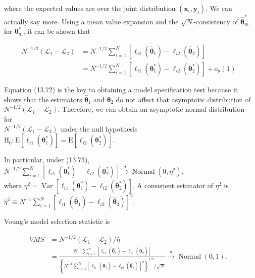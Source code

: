 \documentclass[10pt]{article}
\begin{document}
where the expected values are over the joint distribution $\left(\mathbf{x}_{i}, \mathbf{y}_{i}\right)$. We can actually say more. Using a mean value expansion and the $\sqrt{N}$-consistency of $\hat{\boldsymbol{\theta}}_{m}^{*}$ for $\boldsymbol{\theta}_{m}^{*}$, it can be shown that


\begin{align*}
N^{-1 / 2}\left(\mathscr{L}_{1}-\mathscr{L}_{2}\right) & =N^{-1 / 2} \sum_{i=1}^{N}\left[\ell_{i 1}\left(\hat{\boldsymbol{\theta}}_{1}\right)-\ell_{i 2}\left(\hat{\boldsymbol{\theta}}_{2}\right)\right] \\
& =N^{-1 / 2} \sum_{i=1}^{N}\left[\ell_{i 1}\left(\boldsymbol{\theta}_{1}^{*}\right)-\ell_{i 2}\left(\boldsymbol{\theta}_{2}^{*}\right)\right]+o_{p}(1) \tag{13.72}
\end{align*}


Equation (13.72) is the key to obtaining a model specification test because it shows that the estimators $\hat{\boldsymbol{\theta}}_{1}$ and $\hat{\boldsymbol{\theta}}_{2}$ do not affect that asymptotic distribution of $N^{-1 / 2}\left(\mathscr{L}_{1}-\mathscr{L}_{2}\right)$. Therefore, we can obtain an asymptotic normal distribution for\\
$N^{-1 / 2}\left(\mathscr{L}_{1}-\mathscr{L}_{2}\right)$ under the null hypothesis\\
$\mathrm{H}_{0}: \mathrm{E}\left[\ell_{i 1}\left(\boldsymbol{\theta}_{1}^{*}\right)\right]=\mathrm{E}\left[\ell_{i 2}\left(\boldsymbol{\theta}_{2}^{*}\right)\right]$.

In particular, under (13.73),\\
$N^{-1 / 2} \sum_{i=1}^{N}\left[\ell_{i 1}\left(\boldsymbol{\theta}_{1}^{*}\right)-\ell_{i 2}\left(\boldsymbol{\theta}_{2}^{*}\right)\right] \xrightarrow{d} \operatorname{Normal}\left(0, \eta^{2}\right)$,\\
where $\eta^{2}=\operatorname{Var}\left[\ell_{i 1}\left(\boldsymbol{\theta}_{1}^{*}\right)-\ell_{i 2}\left(\boldsymbol{\theta}_{2}^{*}\right)\right]$. A consistent estimator of $\eta^{2}$ is\\
$\hat{\eta}^{2} \equiv N^{-1} \sum_{i=1}^{N}\left[\ell_{i 1}\left(\hat{\boldsymbol{\theta}}_{1}\right)-\ell_{i 2}\left(\hat{\boldsymbol{\theta}}_{2}\right)\right]^{2}$.

Voung's model selection statistic is


\begin{align*}
V M S & =N^{-1 / 2}\left(\mathscr{L}_{1}-\mathscr{L}_{2}\right) / \hat{\eta} \\
& =\frac{N^{-1} \sum_{i=1}^{N}\left[\ell_{i 1}\left(\hat{\boldsymbol{\theta}}_{1}\right)-\ell_{i 2}\left(\hat{\boldsymbol{\theta}}_{2}\right)\right]}{\left\{N^{-1} \sum_{i=1}^{N}\left[\ell_{i 1}\left(\hat{\boldsymbol{\theta}}_{1}\right)-\ell_{i 2}\left(\hat{\boldsymbol{\theta}}_{2}\right)\right]^{2}\right\}^{1 / 2} / \sqrt{N}} \stackrel{d}{\rightarrow} \operatorname{Normal}(0,1), \tag{13.76}
\end{align*}
\end{document}

